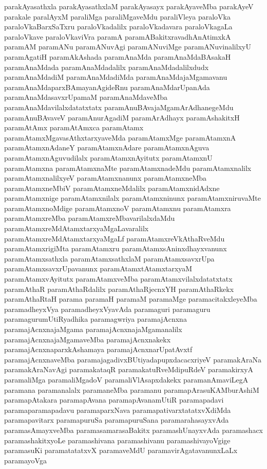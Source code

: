 {parakAyasathxla
parakAyasathxlaM
parakAyasayx
parakAyaveMba
parakAyeV
parakale
paralAyxM
paraliMga
paraliMgaveMdu
paraliVleya
paraloVka
paraloVkaBarxSaTxru
paraloVkadalilx
paraloVkadavara
paraloVkagaLa
paraloVkave
paraloVkaviVra
paramA
paramABakitxravadhAnAtimxkA
paramAM
paramANu
paramANuvAgi
paramANuviMge
paramANuvinalilxyU
paramAgatiH
paramAkAshada
paramAnaMda
paramAnaMdaBAsakaH
paramAnaMdada
paramAnaMdadalilx
paramAnaMdadalilxdudx
paramAnaMdadiM
paramAnaMdadiMda
paramAnaMdajaMgamavanu
paramAnaMdaparxBAmayanAgideRnu
paramAnaMdarUpanAda
paramAnaMdasavxrUpamaM
paramAnaMdaveMba
paramAnaMdavilalxdatatxtatx
paramAnuBAvajaMgamArAdhanegeMdu
paramAnuBAvaveV
paramAnurAgadiM
paramArAdhayx
paramAshakitxH
paramAtAmx
paramAtAmxca
paramAtamx
paramAtamxMgavasAthxtarxyaveMda
paramAtamxMge
paramAtamxnA
paramAtamxnAdaneY
paramAtamxnAdare
paramAtamxnAguva
paramAtamxnAguvudilalx
paramAtamxnAyitutx
paramAtamxnU
paramAtamxna
paramAtamxnaMte
paramAtamxnadeMdu
paramAtamxnalilx
paramAtamxnalilxyeV
paramAtamxnanunx
paramAtamxneMba
paramAtamxneMbiV
paramAtamxneMdalilx
paramAtamxnidAdxne
paramAtamxnige
paramAtamxnilalx
paramAtamxninunx
paramAtamxniruvaMte
paramAtamxnoMdige
paramAtamxnoV
paramAtamxnu
paramAtamxra
paramAtamxreMba
paramAtamxreMbavarilalxdaMdu
paramAtamxreMdAtamxtarxyaMgaLavaralilx
paramAtamxreMdAtamxtarxyaMgaLf
paramAtamxreVkAthaRveMdu
paramAtamxrigiMta
paramAtamxru
paramAtamxsAninxdhayxvanunx
paramAtamxsathxla
paramAtamxsathxlaM
paramAtamxsavxrUpa
paramAtamxsavxrUpavanunx
paramAtamxtAtamxtarxyaM
paramAtamxvAyitutx
paramAtamxveMba
paramAtamxvilalxdatatxtatx
paramAthaR
paramAthaRdalilx
paramAthaRjecnxYH
paramAthaRkekx
paramAthaRtaH
parama
paramaH
paramaM
paramaMge
paramacitakxleyeMba
paramadheyxVya
paramadheyxVyavAda
paramaguri
paramaguru
paramagurumUtiRyadhika
paramagwriya
paramajAcnxna
paramajAcnxnajaMgama
paramajAcnxnajaMgamanalilx
paramajAcnxnajaMgamaveMba
paramajAcnxnakekx
paramajAcnxnaparxkAshamaya
paramajAcnxnarUpatAvxtf
paramajAcnxnaveMba
paramajagadivxBUtiyadapupxdacacxriyeV
paramakAraNa
paramakAraNavAgi
paramakataqR
paramakatuRveMdipuRdeV
paramakirxyA
paramaliMga
paramaliMgadoV
paramaliVlAsapxdakekx
paramanAmaviLegA
paramana
paramanalalx
paramaneMba
paramanu
paramapArasuKAMburAshiM
paramapAtakara
paramapAvana
paramapAvanamUtiR
paramapadavi
paramaparamapadavu
paramaparxNava
paramapativarxtatatxvXdiMda
paramapavitarx
paramapuruSa
paramapuruSana
paramarahasayxvAda
paramasAmayxveMba
paramasamarasaBakitx
paramashUnayxvAda
paramashacx
paramashakitxyoLe
paramashivana
paramashivanu
paramashivayoVgige
paramasuKi
paramatatatxvX
paramaveMdU
paramavirAgatavanunxLaLx
paramayoVga
}
